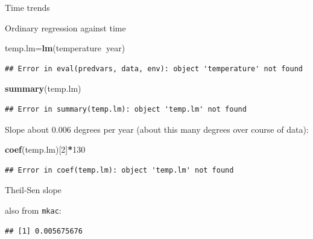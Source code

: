 \documentclass[ignorenonframetext,]{beamer}
\newenvironment{Shaded}{\begin{snugshade}}{\end{snugshade}}
\newcommand{\DecValTok}[1]{\textcolor[rgb]{0.00,0.00,0.81}{#1}}
\newcommand{\KeywordTok}[1]{\textcolor[rgb]{0.13,0.29,0.53}{\textbf{#1}}}
\newcommand{\NormalTok}[1]{#1}
\newcommand{\OperatorTok}[1]{\textcolor[rgb]{0.81,0.36,0.00}{\textbf{#1}}}
\begin{document}
\begin{frame}[fragile]{Time trends}
\begin{block}{Ordinary regression against time}
\begin{Shaded}
\begin{Highlighting}[]
\NormalTok{temp.lm=}\KeywordTok{lm}\NormalTok{(temperature}\OperatorTok{~}\NormalTok{year)}
\end{Highlighting}
\end{Shaded}

\begin{verbatim}
## Error in eval(predvars, data, env): object 'temperature' not found
\end{verbatim}

\begin{Shaded}
\begin{Highlighting}[]
\KeywordTok{summary}\NormalTok{(temp.lm)}
\end{Highlighting}
\end{Shaded}

\begin{verbatim}
## Error in summary(temp.lm): object 'temp.lm' not found
\end{verbatim}

Slope about 0.006 degrees per year (about this many degrees over course
of data):

\begin{Shaded}
\begin{Highlighting}[]
\KeywordTok{coef}\NormalTok{(temp.lm)[}\DecValTok{2}\NormalTok{]}\OperatorTok{*}\DecValTok{130}
\end{Highlighting}
\end{Shaded}

\begin{verbatim}
## Error in coef(temp.lm): object 'temp.lm' not found
\end{verbatim}

\end{block}

\begin{block}{Theil-Sen slope}

also from \texttt{mkac}:

\begin{Shaded}
\end{Shaded}

\begin{verbatim}
## [1] 0.005675676
\end{verbatim}


\end{block}
\end{frame}
\end{document}
